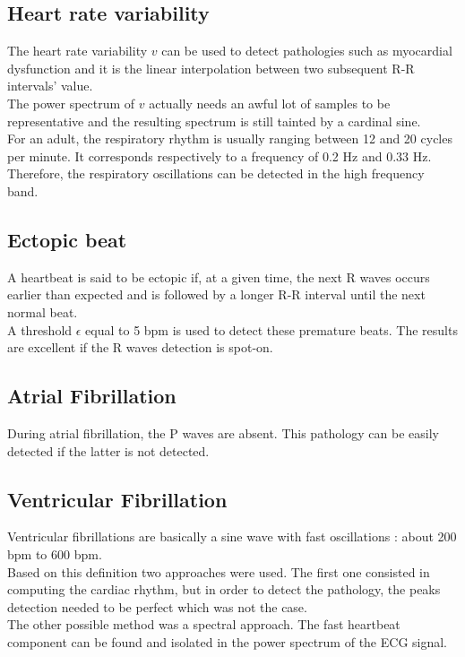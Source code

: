 \documentclass[11pt]{article}
\begin{document}
	\subsection{Heart rate variability}
		The heart rate variability $v$ can be used to detect pathologies such as myocardial dysfunction and it is the linear interpolation between two subsequent R-R intervals' value.\\
		The power spectrum of $v$ actually needs an awful lot of samples to be representative and the resulting spectrum is still tainted by a cardinal sine.\\
		For an adult, the respiratory rhythm is usually ranging between 12 and 20 cycles per minute. It corresponds respectively to a frequency of 0.2 Hz and 0.33 Hz. Therefore, the respiratory oscillations can be detected in the high frequency band.
	\subsection{Ectopic beat}
		A heartbeat is said to be ectopic if, at a given time, the next R waves occurs earlier than expected and is followed by a longer R-R interval until the next normal beat.\\
		A threshold $\epsilon$ equal to 5 bpm is used to detect these premature beats. The results are excellent if the R waves detection is spot-on.
	\subsection{Atrial Fibrillation}
		During atrial fibrillation, the P waves are absent. This pathology can be easily detected if the latter is not detected.
	\subsection{Ventricular Fibrillation}
		Ventricular fibrillations are basically a sine wave with fast oscillations : about 200 bpm to 600 bpm.\\
		Based on this definition two approaches were used. The first one consisted in computing the cardiac rhythm, but in order to detect the pathology, the peaks detection needed to be perfect which was not the case.\\
		The other possible method was a spectral approach. The fast heartbeat component can be found and isolated in the power spectrum of the ECG signal.

		
\end{document}
